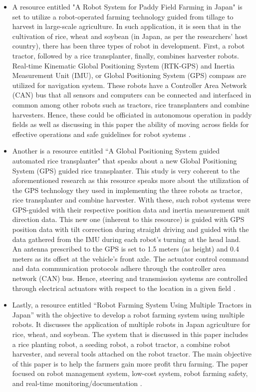 \begin{itemize}

\item A resource entitled "A Robot System for Paddy Field Farming in Japan" is set to utilize a robot-operated farming technology guided from tillage to harvest in large-scale agriculture. In such application, it is seen that in the cultivation of rice, wheat and soybean (in Japan, as per the researchers' host country), there has been three types of robot in development. First, a robot tractor, followed by a rice transplanter, finally, combines harvester robots. Real-time Kinematic Global Positioning System (RTK-GPS) and Inertia Measurement Unit (IMU), or Global Positioning System (GPS) compass are utilized for navigation system. These robots have a Controller Area Network (CAN) bus that all sensors and computers can be connected and interfaced in common among other robots such as tractors, rice transplanters and combine harvesters. Hence, these could be officiated in autonomous operation in paddy fields as well as discussing in this paper the ability of moving across fields for effective operations and safe guidelines for robot systems \cite{Noguchi2011}.
 
\item Another is a resource entitled “A Global Positioning System guided automated rice transplanter" that speaks about a new Global Positioning System (GPS) guided rice transplanter. This study is very coherent to the aforementioned research as this resource speaks more about the utilization of the GPS technology they used in implementing the three robots as tractor, rice transplanter and combine harvester. With these, such robot systems were GPS-guided with their respective position data and inertia measurement unit direction data. This new one (inherent to this resource) is guided with GPS position data with tilt correction during straight driving and guided with the data gathered from the IMU during each robot's turning at the head land. An antenna prescribed to the GPS is set to 1.5 meters (as height) and 0.4 meters as its offset at the vehicle's front axle. The actuator control command and data communication protocols adhere through the controller area network (CAN) bus. Hence, steering and transmission systems are controlled through electrical actuators with respect to the location in a given field \cite{Nagasaka2013}.
 
\item Lastly, a resource entitled “Robot Farming System Using Multiple Tractors in Japan” with the objective to develop a robot farming system using multiple robots. It discusses the application of multiple robots in Japan agriculture for rice, wheat, and soybean. The system that is discussed in this paper includes a rice planting robot, a seeding robot, a robot tractor, a combine robot harvester, and several tools attached on the robot tractor. The main objective of this paper is to help the farmers gain more profit thru farming. The paper focused on robot management system, low-cost system, robot farming safety, and real-time monitoring/documentation \cite{Tamaki2013}.
\end{itemize}



